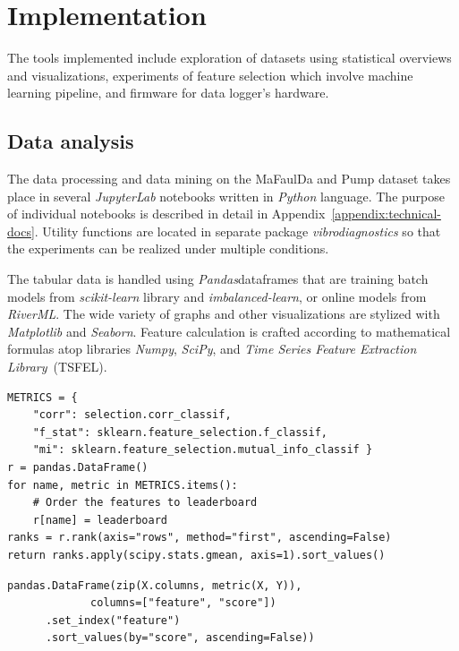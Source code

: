 \chapter{Implementation} \label{chapter:implementation}
The tools implemented include exploration of datasets using statistical overviews and visualizations, experiments of feature selection which involve machine learning pipeline, and firmware for data logger's hardware. 

\section{Data analysis}
The data processing and data mining on the MaFaulDa and Pump dataset takes place in several \emph{JupyterLab} notebooks written in \emph{Python} language. The purpose of individual notebooks is described in detail in Appendix~\ref{appendix:technical-docs}. Utility functions are located in separate package \emph{vibrodiagnostics} so that the experiments can be realized under multiple conditions.

The tabular data is handled using \emph{Pandas}dataframes that are training batch models from \emph{scikit-learn} library and \emph{imbalanced-learn}, or online models from \emph{RiverML}. The wide variety of graphs and other visualizations are stylized with \emph{Matplotlib} and \emph{Seaborn}. Feature calculation is crafted according to mathematical formulas atop libraries \emph{Numpy}, \emph{SciPy}, and \emph{Time Series Feature Extraction Library}~(TSFEL).

\begin{lstlisting}[style=pythonstyle,caption=Rank product of feature matrix X to label column Y,label={lst:rank-product},morekeywords={DataFrame,rank,set_index,sort_values,gmean}]
METRICS = {
    "corr": selection.corr_classif, 
    "f_stat": sklearn.feature_selection.f_classif, 
    "mi": sklearn.feature_selection.mutual_info_classif }
r = pandas.DataFrame()
for name, metric in METRICS.items():
    # Order the features to leaderboard
    r[name] = leaderboard  
ranks = r.rank(axis="rows", method="first", ascending=False)
return ranks.apply(scipy.stats.gmean, axis=1).sort_values()
\end{lstlisting}

\begin{lstlisting}[style=pythonstyle,caption=Leaderboard of feature importance metric scores,label={lst:feature-leaderboard},morekeywords={DataFrame,rank,set_index,sort_values,metric,gmean}]
pandas.DataFrame(zip(X.columns, metric(X, Y)), 
             columns=["feature", "score"])
      .set_index("feature")
      .sort_values(by="score", ascending=False))
\end{lstlisting}

